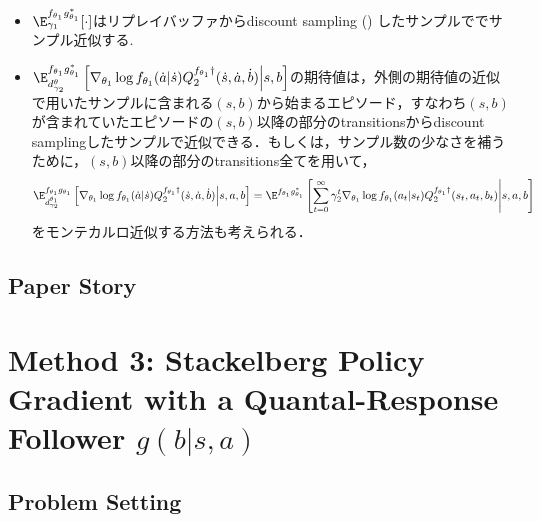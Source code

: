 \documentclass[a4paper,10pt,dvipdfmx]{jsarticle}
\begin{document}
\begin{itemize}
\begin{itemize}
\begin{align}
            &\widehat{L}(\omega_1;\theta_1):=\dfrac{1}{N}\sum_{i=0}^N\left(r_1^{(i)}+\gamma_1Q_{\bar{\omega}_1}(s_i',a_i',b_i') - Q_{\omega_1}(s_i,a_i,b_i)\right)^2\Big|_{a_i'\sim f_{\bar{\theta}_1}(\cdot|s_i'),b_i'\sim g_{\bar{\theta}_2}(\cdot|s_i')},
        \end{align}
        where a minibatch of $N$ transitions $(s_i,a_i,b_i,r_1^{(i)},s_i')$ is sampled from replay buffer $\mathcal{D}$.
    \end{itemize}
    \item $\E_{\gamma_1}^{f_{\theta_1}g_{\theta_1}^*}[\cdot]$はリプレイバッファからdiscount sampling () したサンプルででサンプル近似する.
    \item $\E_{d_{\gamma_2}^{\theta}}^{f_{\theta_1}g_{\theta_1}^*}\left[\nabla_{\theta_1}\log f_{\theta_1}(\dot{a}|\dot{s})Q_2^{f_{\theta_1}\dag}(\dot{s},\dot{a},\dot{b})\middle|s,b\right]$の期待値は，外側の期待値の近似で用いたサンプルに含まれる$(s,b)$から始まるエピソード，すなわち$(s,b)$が含まれていたエピソードの$(s,b)$以降の部分のtransitionsからdiscount samplingしたサンプルで近似できる．もしくは，サンプル数の少なさを補うために，$(s,b)$以降の部分のtransitions全てを用いて，
    \begin{align}
        \E_{d_{\gamma_2}^{\theta_1}}^{f_{\theta_1}g_{\theta_1}}\left[\nabla_{\theta_1}\log f_{\theta_1}(\dot{a}|\dot{s})Q_2^{f_{\theta_1}\dag}(\dot{s},\dot{a},\dot{b})\middle|s,a,b\right]=\E^{f_{\theta_1}g_{\theta_1}^*}\left[\sum_{t=0}^{\infty}\gamma_2^t \nabla_{\theta_1}\log f_{\theta_1}(a_t|s_t)Q_2^{f_{\theta_1}\dag}(s_t,a_t,b_t)\middle|s,a,b\right]
    \end{align}
    をモンテカルロ近似する方法も考えられる．
\end{itemize}


\subsection{Paper Story}


\section{Method 3: Stackelberg Policy Gradient with a Quantal-Response Follower $g(b|s,a)$}\label{sec:ST_SPG_QRF_BBF}

\subsection{Problem Setting}
\end{document}
